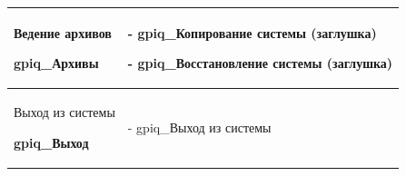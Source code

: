 \begin{table}[h!p]
\begin{tabular}{|p{8cm}|p{8cm}|}

Ведение архивов \par
\hspace{0pt} \par
\textbf{gpiq\_Архивы}
&
- gpiq\_Копирование системы (заглушка) \par
- gpiq\_Восстановление системы (заглушка) \par
\\ \hline


Выход из системы \par
\hspace{0pt} \par
\textbf{gpiq\_Выход}
&
- gpiq\_Выход из системы
\\ \hline


    \end{tabular}
\end{table}

\newpage
